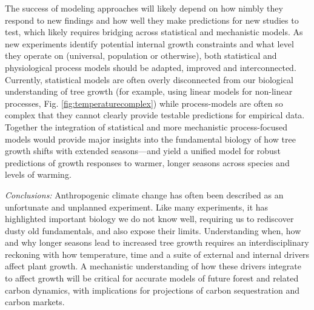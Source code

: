 \documentclass[11pt]{article}
\begin{document}
The success of modeling approaches will likely depend on how nimbly they respond to new findings and how well they make predictions for new studies to test, which likely requires bridging across statistical and mechanistic models. As new experiments identify potential internal growth constraints and what level they operate on (universal, population or otherwise), both statistical and physiological process models should be adapted, improved and interconnected. Currently, statistical models are often overly disconnected from our biological understanding of tree growth (for example, using linear models for non-linear processes, Fig. \ref{fig:temperaturecomplex}) while process-models are often so complex that they cannot clearly provide testable predictions for empirical data. Together the integration of statistical and more mechanistic process-focused models would provide major insights into the fundamental biology of how tree growth shifts with extended seasons---and yield a unified model for robust predictions of growth responses to warmer, longer seasons across species and levels of warming. %

\emph{Conclusions:} 
Anthropogenic climate change has often been described as an unfortunate and unplanned experiment. Like many experiments, it has highlighted important biology we do not know well, requiring us to rediscover dusty old fundamentals, and also expose their limits. Understanding when, how and why longer seasons lead to increased tree growth requires an interdisciplinary reckoning with how temperature, time and a suite of external and internal drivers affect plant growth. A mechanistic understanding of how these drivers integrate to affect growth will be critical for accurate models of future forest and related carbon dynamics, with implications for projections of carbon sequestration and carbon markets. 


\end{document}
